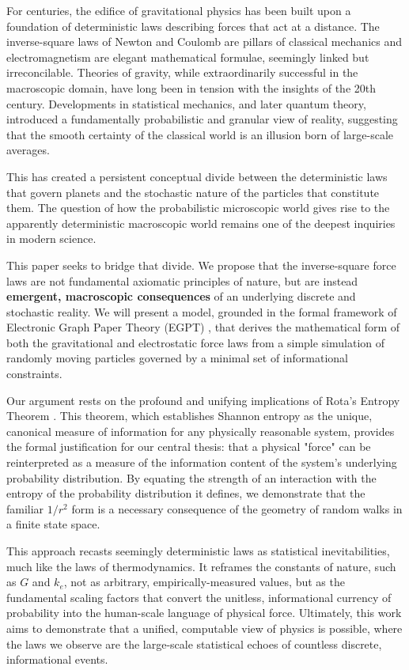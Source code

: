 \documentclass[11pt, letterpaper]{article}
\begin{document}
For centuries, the edifice of gravitational physics has been built upon a foundation of deterministic laws describing forces that act at a distance. The inverse-square laws of Newton and Coulomb are pillars of classical mechanics and electromagnetism are elegant mathematical formulae, seemingly linked but irreconcilable. Theories of gravity, while extraordinarily successful in the macroscopic domain, have long been in tension with the insights of the 20th century. Developments in statistical mechanics, and later quantum theory, introduced a fundamentally probabilistic and granular view of reality, suggesting that the smooth certainty of the classical world is an illusion born of large-scale averages.

This has created a persistent conceptual divide between the deterministic laws that govern planets and the stochastic nature of the particles that constitute them. The question of how the probabilistic microscopic world gives rise to the apparently deterministic macroscopic world remains one of the deepest inquiries in modern science.

This paper seeks to bridge that divide. We propose that the inverse-square force laws are not fundamental axiomatic principles of nature, but are instead \textbf{emergent, macroscopic consequences} of an underlying discrete and stochastic reality. We will present a model, grounded in the formal framework of Electronic Graph Paper Theory (EGPT) \cite{EGPTRepo}, that derives the mathematical form of both the gravitational and electrostatic force laws from a simple simulation of randomly moving particles governed by a minimal set of informational constraints.

Our argument rests on the profound and unifying implications of Rota's Entropy Theorem \cite{RotaProb}. This theorem, which establishes Shannon entropy as the unique, canonical measure of information for any physically reasonable system, provides the formal justification for our central thesis: that a physical "force" can be reinterpreted as a measure of the information content of the system's underlying probability distribution. By equating the strength of an interaction with the entropy of the probability distribution it defines, we demonstrate that the familiar $1/r^2$ form is a necessary consequence of the geometry of random walks in a finite state space.

This approach recasts seemingly deterministic laws as statistical inevitabilities, much like the laws of thermodynamics. It reframes the constants of nature, such as $G$ and $k_e$, not as arbitrary, empirically-measured values, but as the fundamental scaling factors that convert the unitless, informational currency of probability into the human-scale language of physical force. Ultimately, this work aims to demonstrate that a unified, computable view of physics is possible, where the laws we observe are the large-scale statistical echoes of countless discrete, informational events.
\end{document}
